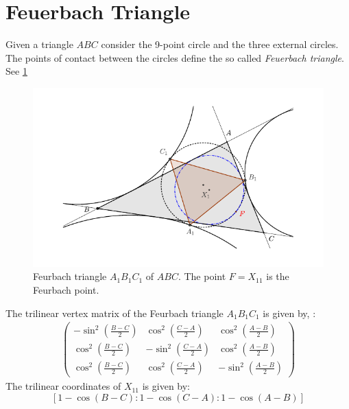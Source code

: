 \section{Feuerbach Triangle}

Given a triangle $ABC$ consider the 9-point circle and the three external circles. The points of contact between the circles define the so called {\em Feuerbach triangle}. See \cref{fig:appA-feurbach-triangle}

   \begin{figure}[H]
     \centering
      \includegraphics[scale=0.9]{zappA/pics/pics-appA-130-feurbach-triangle.pdf}
    \caption{Feurbach triangle $A_1B_1C_1$ of $ABC$. The point $F=X_{11}$ is the Feurbach point.}
    \label{fig:appA-feurbach-triangle}
\end{figure}


The trilinear vertex matrix of the Feurbach triangle $A_1B_1C_1$ is given by, \cite[Feurbach triangle]{mw}:
\begin{align*}
  \left(\begin{matrix}-\sin^2(\frac{B-C}{2}) & \cos^2(\frac{C-A}{2})  & \cos^2(\frac{A-B}{2})\\ \cos^2(\frac{B-C}{2}) & -\sin^2(\frac{C-A}{2}) & \cos^2(\frac{A-B}{2})\\ \cos^2(\frac{B-C}{2}) & \cos^2(\frac{C-A}{2}) & -\sin^2(\frac{A-B}{2})\end{matrix}\right)
\end{align*}
The trilinear coordinates of $X_{11}$ is given by:
\[[ 1 - \cos(B - C) : 1 - \cos(C - A) : 1 - \cos(A - B)]\]